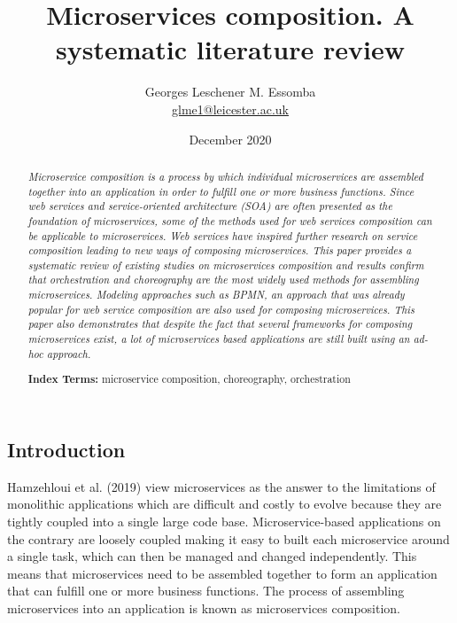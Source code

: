 \documentclass{article}
\begin{document}
\author{Georges Leschener M. Essomba \\ \href{mailto:glme1@leicester.ac.uk}{glme1@leicester.ac.uk} }
\title{Microservices composition. A systematic literature review}
\date{December 2020} %

\maketitle{} %

\pagebreak %
\tableofcontents %
\listoffigures
\listoftables
\pagebreak %

\renewcommand*\abstractname{\flushleft\textbf{Abstract}\hfill}
\begin{multicols}{2}
\begin{abstract}
\emph{Microservice composition is a process by which individual microservices are assembled together into an application in order to fulfill one or more business functions. Since web services and service-oriented architecture (SOA) are often presented as the foundation of microservices, some of the methods used for web services composition can be applicable to microservices. Web services have inspired further research on service composition leading to new ways of composing microservices. This paper provides a systematic review of existing studies on microservices composition and results confirm that orchestration and choreography are the most widely used methods for assembling microservices. Modeling approaches such as BPMN, an approach that was already popular for web service composition are also used for composing microservices. This paper also demonstrates that despite the fact that several frameworks for composing microservices exist, a lot of microservices based applications are still built using an ad-hoc approach.}

\textbf{Index Terms:} microservice composition, choreography, orchestration

\noindent 


\end{abstract}

\section{Introduction}
Hamzehloui et al. (2019) view microservices as the answer to the limitations of monolithic applications which are difficult and costly to evolve because they are tightly coupled into a single large code base. Microservice-based applications on the contrary are loosely coupled making it easy to built each microservice around a single task, which can then be managed and changed independently. This means that microservices need to be assembled together to form an application that can fulfill one or more business functions. The process of assembling microservices into an application is known as microservices composition. 


\end{multicols}
\end{document}
